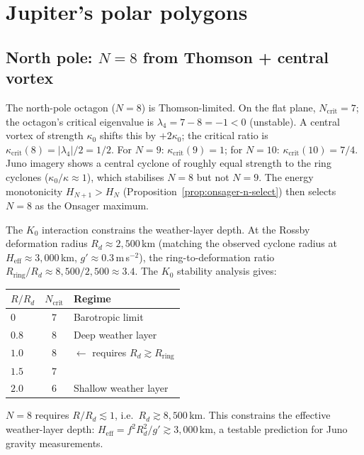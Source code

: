 \section{Jupiter's polar polygons}
\label{sec:jupiter}

\subsection{North pole: $N = 8$ from Thomson + central vortex}

The north-pole octagon ($N = 8$) is Thomson-limited.
On the flat plane, $N_{\mathrm{crit}} = 7$; the octagon's
critical eigenvalue is $\lambda_4 = 7 - 8 = -1 < 0$ (unstable).
A central vortex of strength $\kappa_0$ shifts this by
$+2\kappa_0$; the critical ratio is
$\kappa_{\mathrm{crit}}(8) = |\lambda_4|/2 = 1/2$.
For $N = 9$: $\kappa_{\mathrm{crit}}(9) = 1$; for $N = 10$:
$\kappa_{\mathrm{crit}}(10) = 7/4$.
Juno imagery shows a central cyclone of roughly equal strength
to the ring cyclones ($\kappa_0/\kappa \approx 1$),
which stabilises $N = 8$ but not $N = 9$.
The energy monotonicity $H_{N+1} > H_N$
(Proposition~\ref{prop:onsager-n-select})
then selects $N = 8$ as the Onsager maximum.

\smallskip\noindent
The $K_0$ interaction constrains the weather-layer depth.
At the Rossby deformation radius $R_d \approx 2{,}500$\,km
(matching the observed cyclone radius at
$H_{\mathrm{eff}} \approx 3{,}000$\,km,
$g' \approx 0.3$\,m\,s$^{-2}$), the ring-to-deformation ratio
$R_{\mathrm{ring}}/R_d \approx 8{,}500/2{,}500 \approx 3.4$.
The $K_0$ stability analysis gives:
\begin{center}
\small
\begin{tabular}{lcl}
\toprule
$R/R_d$ & $N_{\mathrm{crit}}$ & Regime \\
\midrule
$0$ & $7$ & Barotropic limit \\
$0.8$ & $8$ & Deep weather layer \\
$1.0$ & $8$ & $\leftarrow$ requires $R_d \gtrsim R_{\mathrm{ring}}$ \\
$1.5$ & $7$ & \\
$2.0$ & $6$ & Shallow weather layer \\
\bottomrule
\end{tabular}
\end{center}
\noindent
$N = 8$ requires $R/R_d \lesssim 1$, i.e.\
$R_d \gtrsim 8{,}500$\,km.
This constrains the effective weather-layer depth:
$H_{\mathrm{eff}} = f^2 R_d^2/g' \gtrsim 3{,}000$\,km,
a testable prediction for Juno gravity measurements.

